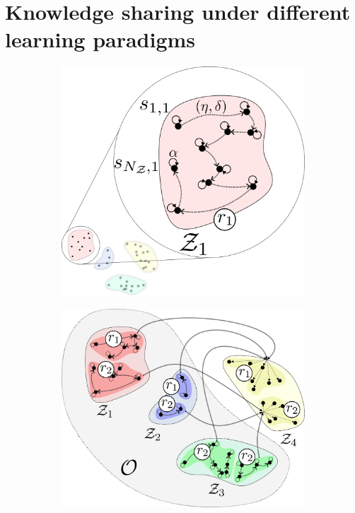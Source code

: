 \documentclass[12pt]{article}
\begin{document}
\section*{Knowledge sharing under different learning paradigms}
\begin{figure}[!t]
	\centering
	\hspace*{\fill}
	\begin{subfigure}[t]{0.32\textwidth}
		\subcaption{}
		\includegraphics[width= \textwidth]{intra_skill_learning.png} \label{fig:intra_skill_learning}
	\end{subfigure}
	\hfill
	\begin{subfigure}[t]{0.32\textwidth}
		\subcaption{}
		\includegraphics[width=\textwidth]{cluster_to_cluster_knowledge_transfer_parallel.png} \label{fig:cluster_to_cluster_knowledge_transfer_parallel}

\end{subfigure}
\end{figure}
\end{document}
